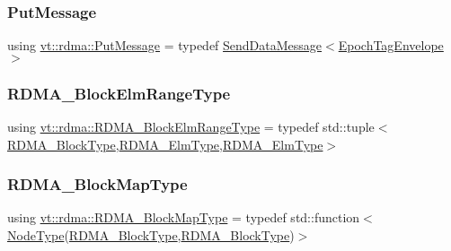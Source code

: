 \mbox{\label{namespacevt_1_1rdma_ae0a0330c647ec5ac5d508750f4cd4a06}} 
\subsubsection{\texorpdfstring{Put\+Message}{PutMessage}}
{\footnotesize\ttfamily using \hyperlink{namespacevt_1_1rdma_ae0a0330c647ec5ac5d508750f4cd4a06}{vt\+::rdma\+::\+Put\+Message} = typedef \hyperlink{structvt_1_1rdma_1_1_send_data_message}{Send\+Data\+Message}$<$\hyperlink{namespacevt_af23b58014ced6898422213a0e5e6a27a}{Epoch\+Tag\+Envelope}$>$}

\mbox{\label{namespacevt_1_1rdma_a8320f97b4a2866df60d9778486dbcd0f}} 
\subsubsection{\texorpdfstring{R\+D\+M\+A\+\_\+\+Block\+Elm\+Range\+Type}{RDMA\_BlockElmRangeType}}
{\footnotesize\ttfamily using \hyperlink{namespacevt_1_1rdma_a8320f97b4a2866df60d9778486dbcd0f}{vt\+::rdma\+::\+R\+D\+M\+A\+\_\+\+Block\+Elm\+Range\+Type} = typedef std\+::tuple$<$\hyperlink{namespacevt_ae54d2ca8f6bb4d65faf65118c82cd6f7}{R\+D\+M\+A\+\_\+\+Block\+Type},\hyperlink{namespacevt_a2c2a902092b72056f70210c159f966f0}{R\+D\+M\+A\+\_\+\+Elm\+Type},\hyperlink{namespacevt_a2c2a902092b72056f70210c159f966f0}{R\+D\+M\+A\+\_\+\+Elm\+Type}$>$}

\mbox{\label{namespacevt_1_1rdma_a049e294a5236ad30692253d5f82886c9}} 
\subsubsection{\texorpdfstring{R\+D\+M\+A\+\_\+\+Block\+Map\+Type}{RDMA\_BlockMapType}}
{\footnotesize\ttfamily using \hyperlink{namespacevt_1_1rdma_a049e294a5236ad30692253d5f82886c9}{vt\+::rdma\+::\+R\+D\+M\+A\+\_\+\+Block\+Map\+Type} = typedef std\+::function$<$\hyperlink{namespacevt_a866da9d0efc19c0a1ce79e9e492f47e2}{Node\+Type}(\hyperlink{namespacevt_ae54d2ca8f6bb4d65faf65118c82cd6f7}{R\+D\+M\+A\+\_\+\+Block\+Type},\hyperlink{namespacevt_ae54d2ca8f6bb4d65faf65118c82cd6f7}{R\+D\+M\+A\+\_\+\+Block\+Type})$>$}


